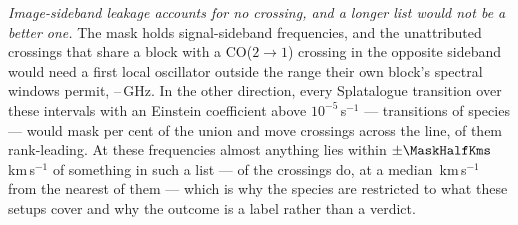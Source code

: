 \emph{Image-sideband leakage accounts for no crossing, and a longer list
would not be a better one.} The mask holds signal-sideband frequencies, and
the \MkImgN{} unattributed crossings that share a block with a CO($2\to1$)
crossing in the opposite sideband would need a first local oscillator outside
the range their own block's spectral windows permit,
\MkImgLOLo--\MkImgLOHi\,GHz. In the other direction, every Splatalogue
transition over these intervals with an Einstein coefficient above
$10^{-5}$\,s$^{-1}$ --- \MaskDbTrans{} transitions of \MaskDbCarriers{}
species --- would mask \MaskDbPctUnion{} per cent of the union and move
\FrFullNFlip{} crossings across the line, \FrFullNFlipRankWord{} of them
rank-leading. At these frequencies almost anything lies within
$\pm\MaskHalfKms$\,km\,s$^{-1}$ of something in such a list ---
\TnNNearDb{} of the \NCross{} crossings do, at a median
\TnMedDbKms\,km\,s$^{-1}$ from the nearest of them --- which is why the
species are restricted to what these setups cover and why the outcome is a
label rather than a verdict.
